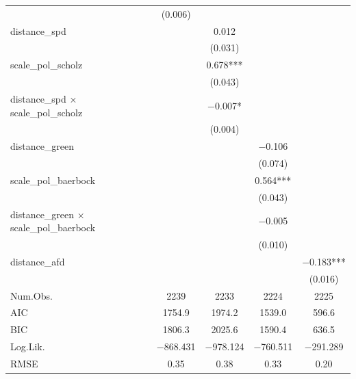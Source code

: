 \documentclass[
]{article}
\begin{document}
\begin{table}
{\begin{tabular}[t]{lcccc}
 & (\num{0.006}) &  &  & \\
distance\_spd &  & \num{0.012} &  & \\
 &  & (\num{0.031}) &  & \\
scale\_pol\_scholz &  & \num{0.678}*** &  & \\
 &  & (\num{0.043}) &  & \\
distance\_spd × scale\_pol\_scholz &  & \num{-0.007}* &  & \\
 &  & (\num{0.004}) &  & \\
distance\_green &  &  & \num{-0.106} & \\
 &  &  & (\num{0.074}) & \\
scale\_pol\_baerbock &  &  & \num{0.564}*** & \\
 &  &  & (\num{0.043}) & \\
distance\_green × scale\_pol\_baerbock &  &  & \num{-0.005} & \\
 &  &  & (\num{0.010}) & \\
distance\_afd &  &  &  & \num{-0.183}***\\
 &  &  &  & (\num{0.016})\\
\midrule
Num.Obs. & \num{2239} & \num{2233} & \num{2224} & \num{2225}\\
AIC & \num{1754.9} & \num{1974.2} & \num{1539.0} & \num{596.6}\\
BIC & \num{1806.3} & \num{2025.6} & \num{1590.4} & \num{636.5}\\
Log.Lik. & \num{-868.431} & \num{-978.124} & \num{-760.511} & \num{-291.289}\\
RMSE & \num{0.35} & \num{0.38} & \num{0.33} & \num{0.20}\\
\bottomrule
\end{tabular}}
\end{table}
\end{document}
